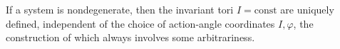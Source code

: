If a system is nondegenerate, then the invariant tori $I = \text{const}$ are uniquely defined, independent of the choice of action-angle coordinates $I, \varphi$, the construction of which always involves some arbitrariness.
